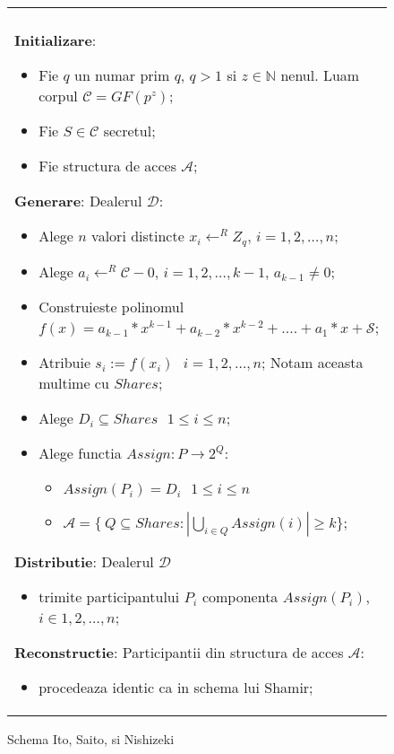 \documentclass{llncs}
\begin{document}
\begin{figure*}[h!]

\begin{tabular}{|p{\textwidth}|}
\hline

\\
\hspace{.1in}
\textbf{Initializare}: 
	\begin{itemize}
		\item Fie $q$ un numar prim $q$, $q > 1$ si $z \in \mathbb{N}$ nenul. Luam corpul $\mathcal{C} = GF(p^z)$;
		\item Fie $S \in \mathcal{C}$ secretul;
		\item Fie structura de acces $\mathcal{A}$;
	\end{itemize}

\medskip

\hspace{.1in}
\textbf{Generare}: Dealerul $\mathcal{D}$:
	\begin{itemize}
		\setlength{\itemsep}{5pt}
		\item Alege $n$ valori distincte $x_i \leftarrow^R Z_q \text{, }i = 1,2,\dots,n$;
		\item Alege $a_{i} \leftarrow^R \mathcal{C} - {0} \text{, }i = 1,2,\dots,{k - 1}$, $a_{k-1} \neq 0$;
		\item Construieste polinomul $f(x) = a_{k - 1} * x ^ {k-1} + a_{k-2} * x ^ {k - 2} + .... + a_1 * x + \mathcal{S}$;
		\item Atribuie $s_i := f(x_i) \text{ } i = 1,2,\dots,n$; Notam aceasta multime cu $Shares$;
		\item Alege $D_i \subseteq Shares \text{ } 1 \leq i \leq n$;
		\item Alege functia $Assign: P \rightarrow 2^Q$:
			\begin{itemize}
				\item $Assign(P_i) = D_i \text{ } 1 \leq i \leq n$
				\item $\mathcal{A} = \{ \ Q \subseteq Shares: |\underset{i \in Q}{{\bigcup}} Assign(i)| \geq k \}$;
			\end{itemize}
	\end{itemize}
\medskip

\hspace{.1in}
\textbf{Distributie}: Dealerul $\mathcal{D}$
	\begin{itemize}
		\item trimite participantului $P_i$ componenta $Assign(P_i)$, $i \in 1,2,\dots,n$;
	\end{itemize}

\hspace{.1in}
\textbf{Reconstructie}: Participantii din structura de acces $\mathcal{A}$:
	\begin{itemize}
		\item procedeaza identic ca in schema lui Shamir;
	\end{itemize}


\\
\hline
\end{tabular}

\caption{Schema Ito, Saito, si Nishizeki \cite{ITO:1989}}
\label{fig:ito_et_al}
\end{figure*}
\end{document}
